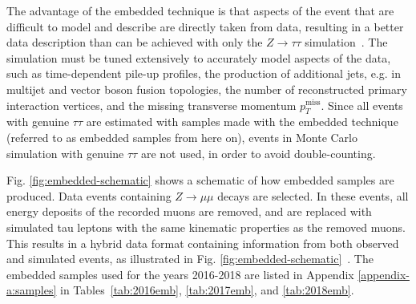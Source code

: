 The advantage of the embedded technique is that aspects of the event that are difficult to model and describe are directly taken from data, resulting in a better data description than can be achieved with only the $Z \rightarrow \tau\tau$ simulation~\cite{CMS-TAU-18-001}. The simulation must be tuned extensively to accurately model aspects of the data, such as time-dependent pile-up profiles, the production of additional jets, e.g. in multijet and vector boson fusion topologies, the number of reconstructed primary interaction vertices, and the missing transverse momentum $p_{T}^{\text{miss}}$. Since all events with genuine $\tau\tau$ are estimated with samples made with the embedded technique (referred to as embedded samples from here on), events in Monte Carlo simulation with genuine $\tau\tau$ are not used, in order to avoid double-counting.

Fig. \ref{fig:embedded-schematic} shows a schematic of how embedded samples are produced. Data events containing $Z \rightarrow \mu\mu$ decays are selected. In these events, all energy deposits of the recorded muons are removed, and are replaced with simulated tau leptons with the same kinematic properties as the removed muons. This results in a hybrid data format containing information from both observed and simulated events, as illustrated in Fig. \ref{fig:embedded-schematic}~\cite{CMS-TAU-18-001}. The embedded samples used for the years 2016-2018 are listed in Appendix \ref{appendix-a:samples} in Tables~\ref{tab:2016emb}, \ref{tab:2017emb}, and \ref{tab:2018emb}.

